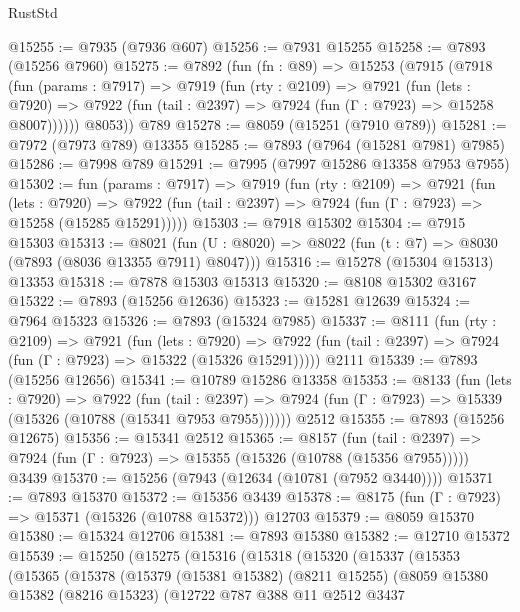 \begin{lexlean}{RustStd}
\begin{coremodule}
@15255 := @7935 (@7936 @607)
@15256 := @7931 @15255
@15258 := @7893 (@15256 @7960)
@15275 := @7892
    (fun (fn : @89) =>
    @15253
      (@7915
        (@7918
          (fun (params : @7917) =>
          @7919
            (fun (rty : @2109) =>
            @7921
              (fun (lets : @7920) =>
              @7922 (fun (tail : @2397) => @7924 (fun (Γ : @7923) => @15258 @8007))))))
        @8053))
    @789
@15278 := @8059 (@15251 (@7910 @789))
@15281 := @7972 (@7973 @789) @13355
@15285 := @7893 (@7964 (@15281 @7981) @7985)
@15286 := @7998 @789
@15291 := @7995 (@7997 @15286 @13358 @7953 @7955)
@15302 := fun (params : @7917) =>
  @7919
    (fun (rty : @2109) =>
    @7921
      (fun (lets : @7920) =>
      @7922 (fun (tail : @2397) => @7924 (fun (Γ : @7923) => @15258 (@15285 @15291)))))
@15303 := @7918 @15302
@15304 := @7915 @15303
@15313 := @8021
    (fun (U : @8020) => @8022 (fun (t : @7) => @8030 (@7893 (@8036 @13355 @7911) @8047)))
@15316 := @15278 (@15304 @15313) @13353
@15318 := @7878 @15303 @15313
@15320 := @8108 @15302 @3167
@15322 := @7893 (@15256 @12636)
@15323 := @15281 @12639
@15324 := @7964 @15323
@15326 := @7893 (@15324 @7985)
@15337 := @8111
    (fun (rty : @2109) =>
    @7921
      (fun (lets : @7920) =>
      @7922 (fun (tail : @2397) => @7924 (fun (Γ : @7923) => @15322 (@15326 @15291)))))
    @2111
@15339 := @7893 (@15256 @12656)
@15341 := @10789 @15286 @13358
@15353 := @8133
    (fun (lets : @7920) =>
    @7922
      (fun (tail : @2397) =>
      @7924 (fun (Γ : @7923) => @15339 (@15326 (@10788 (@15341 @7953 @7955))))))
    @2512
@15355 := @7893 (@15256 @12675)
@15356 := @15341 @2512
@15365 := @8157
    (fun (tail : @2397) => @7924 (fun (Γ : @7923) => @15355 (@15326 (@10788 (@15356 @7955)))))
    @3439
@15370 := @15256 (@7943 (@12634 (@10781 (@7952 @3440))))
@15371 := @7893 @15370
@15372 := @15356 @3439
@15378 := @8175 (fun (Γ : @7923) => @15371 (@15326 (@10788 @15372))) @12703
@15379 := @8059 @15370
@15380 := @15324 @12706
@15381 := @7893 @15380
@15382 := @12710 @15372
@15539 := @15250
    (@15275
      (@15316
        (@15318
          (@15320
            (@15337
              (@15353
                (@15365
                  (@15378
                    (@15379
                      (@15381 @15382)
                      (@8211 @15255)
                      (@8059
                        @15380
                        @15382
                        (@8216 @15323)
                        (@12722
                          @787
                          @388
                          @11
                          @2512
                          @3437

\end{coremodule}
\end{lexlean}
